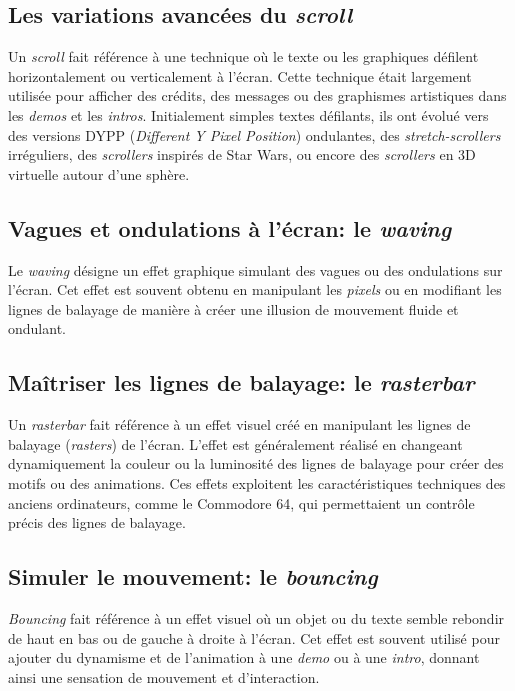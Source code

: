 \subsection*{Les variations avancées du \textit{scroll}}
Un \textit{scroll} fait référence à une technique où le texte ou les graphiques défilent horizontalement ou verticalement à l'écran. Cette technique était largement utilisée pour afficher des crédits, des messages ou des graphismes artistiques dans les \textit{demos} et les \textit{intros}.
Initialement simples textes défilants, ils ont évolué vers des versions DYPP (\textit{Different	Y Pixel	Position}) ondulantes, des \textit{stretch-scrollers} irréguliers, des \textit{scrollers} inspirés de Star Wars, ou encore des \textit{scrollers} en 3D virtuelle autour d'une sphère.

\subsection*{Vagues et ondulations à l'écran: le \textit{waving}}
Le \textit{waving} désigne un effet graphique simulant des vagues ou des ondulations sur l'écran. Cet effet est souvent obtenu en manipulant les \textit{pixels} ou en modifiant les lignes de balayage de manière à créer une illusion de mouvement fluide et ondulant.

\subsection*{Maîtriser les lignes de balayage: le \textit{rasterbar}}
Un \textit{rasterbar} fait référence à un effet visuel créé en manipulant les lignes de balayage (\textit{rasters}) de l'écran. L'effet est généralement réalisé en changeant dynamiquement la couleur ou la luminosité des lignes de balayage pour créer des motifs ou des animations. Ces effets exploitent les caractéristiques techniques des anciens ordinateurs, comme le Commodore 64, qui permettaient un contrôle précis des lignes de balayage.




\subsection*{Simuler le mouvement: le \textit{bouncing}}
\textit{Bouncing} fait référence à un effet visuel où un objet ou du texte semble rebondir de haut en bas ou de gauche à droite à l'écran. Cet effet est souvent utilisé pour ajouter du dynamisme et de l'animation à une \textit{demo} ou à une \textit{intro}, donnant ainsi une sensation de mouvement et d'interaction.

